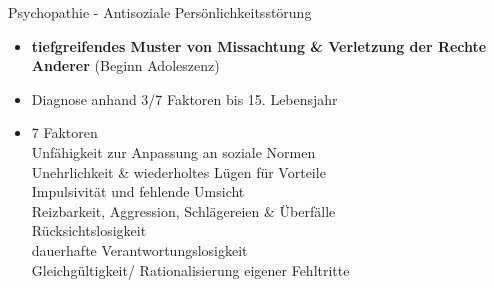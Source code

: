 \documentclass{cheatsheet}
\begin{document}
    \begin{hintbox}{Psychopathie - Antisoziale Persönlichkeitsstörung}
        \begin{itemize}
            \item \textbf{tiefgreifendes Muster von Missachtung \& Verletzung der Rechte Anderer} (Beginn Adoleszenz)
            \item Diagnose anhand 3/7 Faktoren bis 15. Lebensjahr
            \item 7 Faktoren\\
            \ra Unfähigkeit zur Anpassung an soziale Normen\\
            \ra Unehrlichkeit \& wiederholtes Lügen für Vorteile\\
            \ra Impulsivität und fehlende Umsicht\\
            \ra Reizbarkeit, Aggression, Schlägereien \& Überfälle\\
            \ra Rücksichtslosigkeit\\
            \ra dauerhafte Verantwortungslosigkeit\\
            \ra Gleichgültigkeit/ Rationalisierung eigener Fehltritte
        \end{itemize}
    \end{hintbox}
\end{document}
